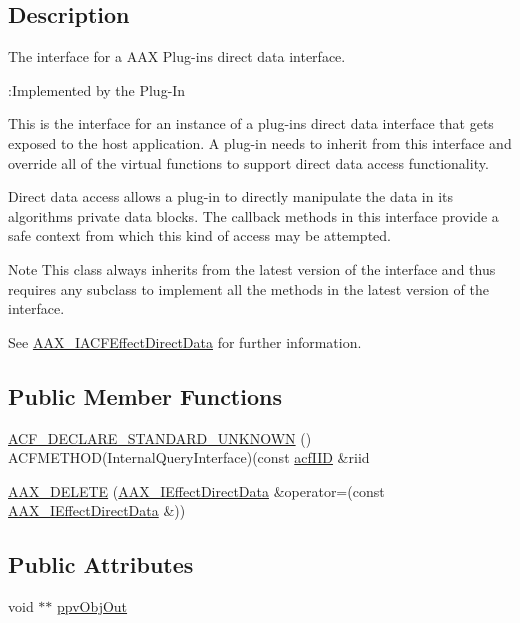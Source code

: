 \subsection{Description}
The interface for a A\+A\+X Plug-\/in\textquotesingle{}s direct data interface. 

\begin{DoxyRefDesc}{\+:\+Implemented by the Plug-\/\+In}
\item[\hyperlink{a00004__aax_plugin_implementation000001}{\+:\+Implemented by the Plug-\/\+In}]\end{DoxyRefDesc}


This is the interface for an instance of a plug-\/in\textquotesingle{}s direct data interface that gets exposed to the host application. A plug-\/in needs to inherit from this interface and override all of the virtual functions to support direct data access functionality.

Direct data access allows a plug-\/in to directly manipulate the data in its algorithm\textquotesingle{}s private data blocks. The callback methods in this interface provide a safe context from which this kind of access may be attempted.

\begin{DoxyNote}{Note}
This class always inherits from the latest version of the interface and thus requires any subclass to implement all the methods in the latest version of the interface.

See \hyperlink{a00059}{A\+A\+X\+\_\+\+I\+A\+C\+F\+Effect\+Direct\+Data} for further information. 
\end{DoxyNote}
\subsection*{Public Member Functions}
\begin{DoxyCompactItemize}
\item 
\hyperlink{a00097_ae303da21b6ac9d50f0c797e49380bb80}{A\+C\+F\+\_\+\+D\+E\+C\+L\+A\+R\+E\+\_\+\+S\+T\+A\+N\+D\+A\+R\+D\+\_\+\+U\+N\+K\+N\+O\+W\+N} () A\+C\+F\+M\+E\+T\+H\+O\+D(Internal\+Query\+Interface)(const \hyperlink{a00150_a59df0b41744eee7a066787aaedf97f67}{acf\+I\+I\+D} \&riid
\item 
\hyperlink{a00097_a05ab4a47b091e970c80e40e047374fe5}{A\+A\+X\+\_\+\+D\+E\+L\+E\+T\+E} (\hyperlink{a00097}{A\+A\+X\+\_\+\+I\+Effect\+Direct\+Data} \&operator=(const \hyperlink{a00097}{A\+A\+X\+\_\+\+I\+Effect\+Direct\+Data} \&))
\end{DoxyCompactItemize}
\subsection*{Public Attributes}
\begin{DoxyCompactItemize}
\item 
void $\ast$$\ast$ \hyperlink{a00097_a365297b233c5341a924e74d758dc2b5d}{ppv\+Obj\+Out}
\end{DoxyCompactItemize}



